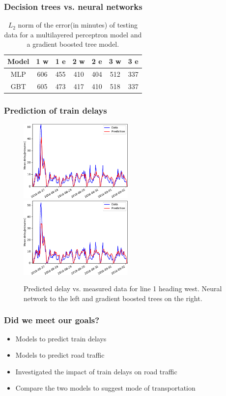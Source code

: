 \documentclass{beamer}
\begin{document}
\begin{frame}\frametitle{Decision trees vs. neural networks}
\begin{table}
\begin{center}
\Large
\begin{tabular}{|c||c|c|c|c|c|c|}\hline
Model & 1 w & 1 e  & 2 w  & 2 e  & 3 w  & 3 e \\\hline\hline
MLP& 606&  455&  410&  404&  512& 337\\\hline
GBT& 605&  473&  417&  410&  518& 337\\\hline
\end{tabular}
\caption{$L_2$ norm of the error(in minutes) of testing data for a multilayered perceptron model and a gradient boosted tree model.}
\normalsize
\end{center}
\end{table}
\end{frame}

\begin{frame}\frametitle{Prediction of train delays}
\begin{figure}
  \centering
   \includegraphics[width=0.5\textwidth]{plots/1w-crop.pdf}
   \includegraphics[width=0.5\textwidth]{plots/1wt-crop.pdf}
    \caption{Predicted delay vs. measured data for line 1 heading west. Neural network to the left and gradient boosted trees on the right.}
\end{figure}
\end{frame}

\begin{frame}\frametitle{Did we meet our goals?}
\begin{itemize}
\item Models to predict train delays
\item Models to predict  road traffic
\item Investigated the impact of train delays on road traffic
\item Compare the two models to suggest mode of transportation
\end{itemize}
\end{frame}
\end{document}
